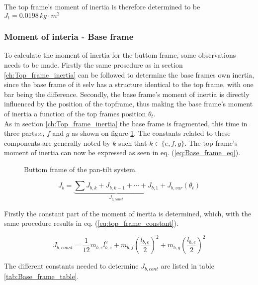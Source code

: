 \documentclass[../../main]{subfiles}
\begin{document}
The top frame's moment of inertia is therefore determined to be
\newline $J_{t} = 0.0198 \si{\,kg\cdot m^2}$

\subsubsection{Moment of interia - Base frame}

To calculate the moment of inertia for the buttom frame, some observations needs to be made. Firstly the same prosedure as in section \ref{ch:Top_frame_inertia} can be followed to determine the base frames own inertia, since the base frame of it selv has a structure identical to the top frame, with one bar being the difference. Secondly, the base frame's moment of inertia is directly influenced by the position of the topframe, thus making the base frame's moment of inertia a function of the top frames position $\theta_t$.\\
As in section \ref{ch:Top_frame_inertia} the base frame is fragmented, this time in three parts:$e$, $f$ and $g$ as shown on figure \ref{fig:ButtomFrame}. The constants related to these components are generally noted by $k$ such that $k \in \{e,f,g\}$. The top frame's moment of inertia can now be expressed as seen in eq. (\ref{eq:Base_frame_eq}).

\begin{figure}[h]
  \centering
  
  \caption{Buttom frame of the pan-tilt system.}
  \label{fig:ButtomFrame}
\end{figure}

\begin{equation}
  \label{eq:Base_frame_eq}
  J_b =
  \underbrace{
  \sum J_{b,k} + J_{b,k-1} + \dotsb + J_{b,1}}_\text{$J_{b,const}$} + J_{b,var}(\theta_t)
\end{equation}

Firstly the constant part of the moment of inertia is determined, which, with the same procedure results in eq. (\ref{eq:top_frame_constant}).

\begin{equation}
  \label{eq:top_frame_constant}
  J_{b,const} = \frac{1}{12}m_{b,e}l_{b,e}^2 + m_{b,f} \left( \frac{l_{b,e}}{2} \right)^2 + m_{b,g}\left(\frac{l_{b,e}}{2}\right)^2
\end{equation}

The different constants needed to determine $J_{b,cont}$ are listed in table \ref{tab:Base_frame_table}.
\end{document}
